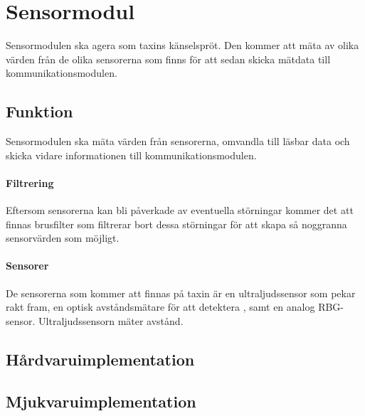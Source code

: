 \documentclass[designspec/spec.tex]{subfiles}
\begin{document}
\section{Sensormodul}
Sensormodulen ska agera som taxins känselspröt. Den kommer att mäta av olika
värden från de olika sensorerna som finns för att sedan skicka mätdata till
kommunikationsmodulen.

\subsection{Funktion}
Sensormodulen ska mäta värden från sensorerna, omvandla till läsbar data och
skicka vidare informationen till kommunikationsmodulen.

\paragraph{Filtrering}
Eftersom sensorerna kan bli påverkade av eventuella störningar kommer det att
finnas brusfilter som filtrerar bort dessa störningar för att skapa så
noggranna sensorvärden som möjligt.

\paragraph{Sensorer}
De sensorerna som kommer att finnas på taxin är en ultraljudssensor som pekar
rakt fram, en optisk avståndsmätare för att detektera , samt en analog RBG-sensor.
Ultraljudssensorn mäter avstånd.


\subsection{Hårdvaruimplementation} 


\subsection{Mjukvaruimplementation} 
\end{document}
